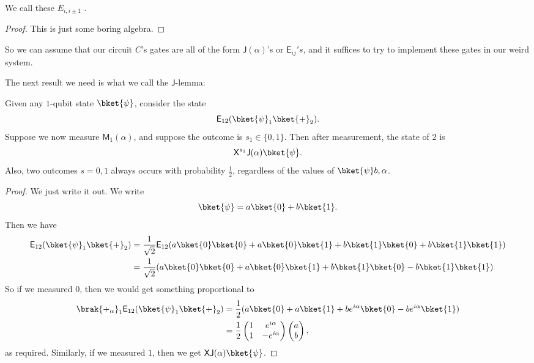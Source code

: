 \documentclass[a4paper]{article}
\newcommand{\qE}{\mathsf{E}}
\newcommand{\qJ}{\mathsf{J}}
\newcommand{\qM}{\mathsf{M}}
\newcommand{\qX}{\mathsf{X}}
\begin{document}
We call these $E_{i, i \pm 1}$ .
\begin{proof}
  This is just some boring algebra.
\end{proof}

So we can assume that our circuit $C$'s gates are all of the form $\qJ(\alpha)$'s or $\qE_{ij}'s$, and it suffices to try to implement these gates in our weird system.

The next result we need is what we call the $\qJ$-lemma:
\begin{lemma}[$\qJ$-lemma]\index{$\qJ$-lemma}
  Given any $1$-qubit state $\bket{\psi}$, consider the state
  \[
    \qE_{12} (\bket{\psi}_1 \bket{+}_2).
  \]
  Suppose we now measure $\qM_1(\alpha)$, and suppose the outcome is $s_1 \in \{0, 1\}$. Then after measurement, the state of $2$ is
  \[
    \qX^{s_1} \qJ(\alpha) \bket{\psi}.
  \]
  Also, two outcomes $s = 0, 1$ always occurs with probability $\frac{1}{2}$, regardless of the values of $\bket{\psi} b, \alpha$.
\end{lemma}

\begin{proof}
  We just write it out. We write
  \[
    \bket{\psi} = a \bket{0} + b \bket{1}.
  \]
  Then we have
  \begin{align*}
    \qE_{12} (\bket{\psi}_1 \bket{+}_2) &= \frac{1}{\sqrt{2}} \qE_{12}(a \bket{0}\bket{0} + a \bket{0}\bket{1} + b \bket{1}\bket{0} + b \bket{1}\bket{1})\\
    &= \frac{1}{\sqrt{2}}(a \bket{0}\bket{0} + a \bket{0}\bket{1} + b \bket{1}\bket{0} - b \bket{1}\bket{1})
  \end{align*}
  So if we measured $0$, then we would get something proportional to
  \begin{align*}
    \brak{+_\alpha}_1\qE_{12} (\bket{\psi}_1 \bket{+}_2) &= \frac{1}{2}(a \bket{0} + a \bket{1} + b e^{i\alpha} \bket{0} - be^{i\alpha} \bket{1})\\
    &= \frac{1}{2}
    \begin{pmatrix}
      1 & e^{i\alpha}\\
      1 & -e^{i\alpha}
    \end{pmatrix}
    \begin{pmatrix}
      a\\b
    \end{pmatrix},
  \end{align*}
  as required. Similarly, if we measured $1$, then we get $\qX \qJ(\alpha) \bket{\psi}$.
\end{proof}
\end{document}
